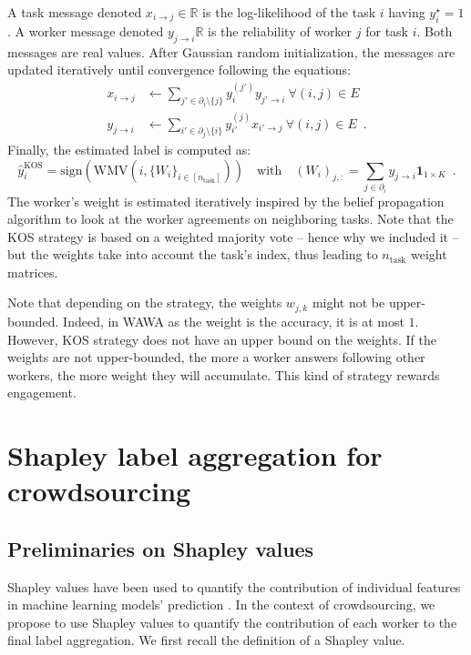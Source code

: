 \documentclass{cap2024}
\begin{document}
\begin{itemize}
  A task message denoted $x_{i\rightarrow j}\in\mathbb{R}$ is the log-likelihood of the task $i$ having $y_i^\star=1$.
  A worker message denoted $y_{j\rightarrow i}\mathbb{R}$ is the reliability of worker $j$ for task $i$.
  Both messages are real values.
  After Gaussian random initialization, the messages are updated iteratively until convergence following the equations:
  \begin{align*}
      x_{i\rightarrow j} &\gets \sum_{j'\in \partial_i\setminus \{j\}} y_i^{(j')}y_{j'\rightarrow i} \ \forall (i,j)\in E \\
      y_{j\rightarrow i} &\gets \sum_{i'\in \partial_j\setminus \{i\}} y_{i'}^{(j)} x_{i'\rightarrow j} \ \forall (i,j)\in E\enspace.
  \end{align*}
  Finally, the estimated label is computed as:
  \begin{equation}
    \hat y_i^{\text{KOS}} = \mathrm{sign}\left(\mathrm{WMV}(i, \{W_i\}_{i\in [n_\text{task}]} )\right)\quad \text{with}\quad (W_i)_{j,:}=\sum_{j\in\partial_i}y_{j\rightarrow i}\mathbf{1}_{1\times K}\enspace.
  \end{equation}
  The worker's weight is estimated iteratively inspired by the belief propagation algorithm to look at the worker agreements on neighboring tasks.
  Note that the KOS strategy is based on a weighted majority vote -- hence why we included it -- but the weights take into account the task's index, thus leading to $n_\text{task}$ weight matrices.

\end{itemize}
Note that depending on the strategy, the weights $w_{j,k}$ might not be upper-bounded. Indeed, in WAWA as the weight is the accuracy, it is at most $1$. However, KOS strategy does not have an upper bound on the weights.
If the weights are not upper-bounded, the more a worker answers following other workers, the more weight they will accumulate. This kind of strategy rewards engagement.

\section{Shapley label aggregation for crowdsourcing}
\label{sec:shapagg}

\subsection{Preliminaries on Shapley values}

Shapley values have been used to quantify the contribution of individual features in machine learning models' prediction \citep{molnar2020interpretable}.
In the context of crowdsourcing, we propose to use Shapley values to quantify the contribution of each worker to the final label aggregation.
We first recall the definition of a Shapley value.
\end{document}
